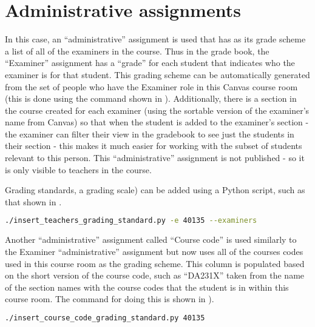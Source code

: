 \section{Administrative assignments}
\label{sec:CRAdministrativeAssignments}

In this case, an ``administrative'' assignment is used that has as its grade scheme a list of all of the examiners in the course. Thus in the grade book, the ``Examiner'' assignment has a ``grade'' for each student that indicates who the examiner is for that student.  This grading scheme can be automatically generated from the set of people who have the Examiner role in this Canvas course room (this is done using the command shown in ). Additionally, there is a section in the course created for each examiner (using the sortable version of the examiner's name from Canvas) so that when the student is added to the examiner's section - the examiner can filter their view in the gradebook to see just the students in their section - this makes it much easier for working with the subset of students relevant to this person. This ``administrative'' assignment is not published - so it is only visible to teachers in the course.

Grading standards, \ie a grading scale) can be added using a Python script, such as that shown in .
\begin{lstlisting}[basicstyle=\footnotesize, language={bash}, columns=fullflexible, showstringspaces=false, caption={Adding a grading standard for all of the examiners to the course},label=lst:CRaddingGradingStandardA]
./insert_teachers_grading_standard.py -e 40135 --examiners
\end{lstlisting}

Another ``administrative'' assignment called ``Course code'' is used similarly to the Examiner ``administrative'' assignment but now uses all of the courses codes used in this course room as the grading scheme. This column is populated based on the short version of the course code, such as ``DA231X'' taken from the name of the section names with the course codes that the student is in within this course room. The command for doing this is shown in ).
\begin{lstlisting}[basicstyle=\footnotesize, language={bash}, columns=fullflexible, showstringspaces=false, caption={Adding grade standard for the course codes to the course},label=lst:CRaddingGradingStandardB]
./insert_course_code_grading_standard.py 40135
\end{lstlisting}

